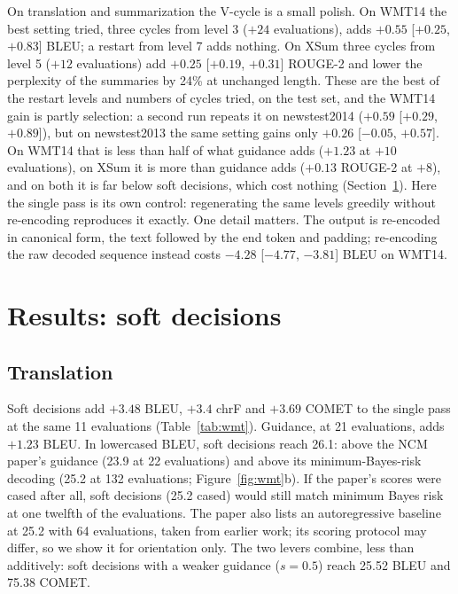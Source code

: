 \documentclass[11pt]{article}
\begin{document}
On translation and summarization the V-cycle is a small polish. On WMT14 the best setting tried, three cycles from
level 3 ($+24$ evaluations), adds $+0.55$ [$+0.25$, $+0.83$] BLEU; a restart from level 7 adds nothing. On XSum three
cycles from level 5 ($+12$ evaluations) add $+0.25$ [$+0.19$, $+0.31$] ROUGE-2 and lower the perplexity of the
summaries by 24\% at unchanged length. These are the best of the restart levels and numbers of cycles tried, on the
test set, and the WMT14 gain is partly selection: a second run repeats it on newstest2014 ($+0.59$ [$+0.29$,
$+0.89$]), but on newstest2013 the same setting gains only $+0.26$ [$-0.05$, $+0.57$]. On WMT14 that is less than half of what guidance adds ($+1.23$ at $+10$ evaluations), on XSum it is more
than guidance adds ($+0.13$ ROUGE-2 at $+8$), and on both it is far below soft decisions, which cost nothing
(Section~\ref{sec:results}). Here the single pass is its own control: regenerating the same levels greedily without
re-encoding reproduces it exactly. One detail matters. The output is re-encoded in canonical form, the text followed
by the end token and padding; re-encoding the raw decoded sequence instead costs $-4.28$ [$-4.77$, $-3.81$] BLEU on
WMT14.

\section{Results: soft decisions}
\label{sec:results}

\subsection{Translation}

Soft decisions add $+3.48$ BLEU, $+3.4$ chrF and $+3.69$ COMET to the single pass at the same 11 evaluations
(Table~\ref{tab:wmt}). Guidance, at 21 evaluations, adds $+1.23$ BLEU. In lowercased BLEU, soft decisions reach
26.1: above the NCM paper's guidance (23.9 at 22 evaluations) and above its minimum-Bayes-risk decoding (25.2 at
132 evaluations; Figure~\ref{fig:wmt}b). If the paper's scores were cased after all, soft decisions (25.2 cased)
would still match minimum Bayes risk at one twelfth of the evaluations. The paper also lists an autoregressive
baseline at 25.2 with 64 evaluations, taken from earlier work; its scoring protocol may differ, so we show it for
orientation only. The two levers combine, less than additively: soft decisions with a weaker guidance ($s=0.5$) reach 25.52 BLEU and
75.38 COMET.
\end{document}
